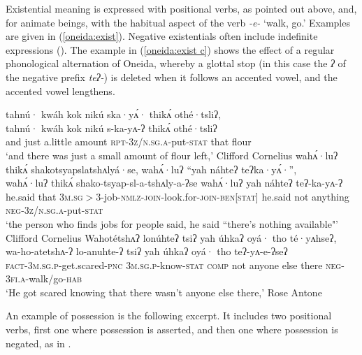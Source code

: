 \documentclass[output=paper,colorlinks,citecolor=brown]{langscibook}
\begin{document}
Existential meaning is expressed with positional verbs, as pointed out above, and, for animate beings, with the habitual aspect of the verb \textit{-e-} `walk, go.' Examples are given in (\ref{oneida:exist}). Negative existentials often include indefinite expressions (). The example in (\ref{oneida:exist c}) shows the effect of a regular phonological alternation of Oneida, whereby a glottal stop (in this case the \textit{ʔ} of the negative prefix \textit{teʔ-}) is deleted when it follows an accented vowel, and the accented vowel lengthens.

\ea\label{oneida:exist}
    \ea\label{oneida:exist a}
        \glll tahnú· kwáh kok nikú ska·yʌ́· thikʌ́ othé·tsliʔ, \\
        tahnú· kwáh kok nikú s-ka-yʌ-ʔ thikʌ́ othé·tsliʔ \\
        and just {a.little} amount \textsc{rpt-3z/n.sg.a}-put-\textsc{stat} that flour \\
        \glt `and there was just a small amount of flour left,' Clifford Cornelius \citep[224 (42)]{MichelsonEtAl2016}
    \ex\label{oneida:exist b} 
        \glll wahʌ́·luʔ thikʌ́ shakotsyapslatshʌlyá·se, wahʌ́·luʔ ``yah náhteʔ teʔka·yʌ́·'', \\
        wahʌ́·luʔ thikʌ́ shako-tsyap-sl-a-tshʌly-a-ʔse wahʌ́·luʔ yah náhteʔ teʔ-ka-yʌ-ʔ \\
        {he.said} that \textsc{3m.sg$>$3}-job-\textsc{nmlz-join}-look.for-\textsc{join-ben[stat]} {he.said} not anything \textsc{neg-3z/n.sg.a}-put-\textsc{stat}\\
        \glt `the person who finds jobs for people said, he said ``there's nothing available"' Clifford Cornelius \citep[231 (90)]{MichelsonEtAl2016}
    \ex\label{oneida:exist c} 
        \glll Wahotétshʌʔ lonúhteʔ tsiʔ yah úhkaʔ oyá· tho té·yʌhseʔ, \\
        wa-ho-atetshʌ-ʔ lo-anuhte-ʔ tsiʔ yah úhkaʔ oyá· tho teʔ-yʌ-e-ʔseʔ \\
        \textsc{fact-3m.sg.p}-get.scared-\textsc{pnc} \textsc{3m.sg.p}-know-\textsc{stat} \textsc{comp} not anyone else there \textsc{neg-3fi.a}-walk/go-\textsc{hab} \\
        \glt `He got scared knowing that there wasn't anyone else there,'	 Rose Antone \citep[100 (12)]{MichelsonEtAl2016}
    \z
\z

An example of possession is the following excerpt. It includes two positional verbs, first one where possession is asserted, and then one where possession is negated, as in . 
\end{document}
